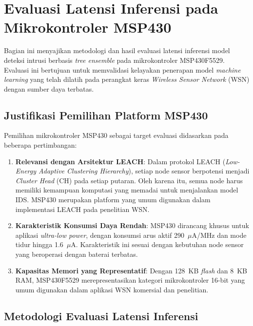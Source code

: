 
\section{Evaluasi Latensi Inferensi pada Mikrokontroler MSP430}

Bagian ini menyajikan metodologi dan hasil evaluasi latensi inferensi model deteksi intrusi berbasis \textit{tree ensemble} pada mikrokontroler MSP430F5529. Evaluasi ini bertujuan untuk memvalidasi kelayakan penerapan model \textit{machine learning} yang telah dilatih pada perangkat keras \textit{Wireless Sensor Network} (WSN) dengan sumber daya terbatas.

\subsection{Justifikasi Pemilihan Platform MSP430}

Pemilihan mikrokontroler MSP430 sebagai target evaluasi didasarkan pada beberapa pertimbangan:

\begin{enumerate}
    \item \textbf{Relevansi dengan Arsitektur LEACH}: Dalam protokol LEACH (\textit{Low-Energy Adaptive Clustering Hierarchy}), setiap node sensor berpotensi menjadi \textit{Cluster Head} (CH) pada setiap putaran. Oleh karena itu, semua node harus memiliki kemampuan komputasi yang memadai untuk menjalankan model IDS. MSP430 merupakan platform yang umum digunakan dalam implementasi LEACH pada penelitian WSN.
    
    \item \textbf{Karakteristik Konsumsi Daya Rendah}: MSP430 dirancang khusus untuk aplikasi \textit{ultra-low power}, dengan konsumsi arus aktif 290~$\mu$A/MHz dan mode tidur hingga 1.6~$\mu$A. Karakteristik ini sesuai dengan kebutuhan node sensor yang beroperasi dengan baterai terbatas.
    
    \item \textbf{Kapasitas Memori yang Representatif}: Dengan 128~KB \textit{flash} dan 8~KB RAM, MSP430F5529 merepresentasikan kategori mikrokontroler 16-bit yang umum digunakan dalam aplikasi WSN komersial dan penelitian.
\end{enumerate}

\subsection{Metodologi Evaluasi Latensi Inferensi}


